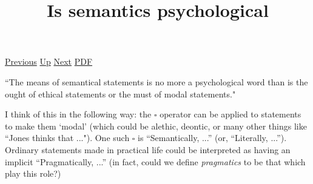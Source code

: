 \documentclass[12pt,a4paper]{report}
\begin{document}
 \href{doc/phil/People/Sellars/Quotes/Exemplification.html}{Previous} 
 \href{doc/phil/People/Sellars/Quotes.html}{Up} 
 \href{doc/phil/People/Sellars/Quotes/Judgmentintheorderofexplanation.html}{Next} 
 \href{doc/phil/People/Sellars/Quotes/Issemanticspsychological.pdf}{PDF} 
\title{Is semantics psychological}
``The means of semantical statements is no more a psychological word than is
the ought of ethical statements or the must of modal statements."

I think of this in the following way: the $\square$ operator can be applied to
statements to make them `modal' (which could be alethic, deontic, or many other
things like ``Jones thinks that ..."). One such $\square$ is ``Semantically,
...'' (or, ``Literally, ...''). Ordinary statements made in practical life
 could be interpreted as having an implicit ``Pragmatically, ...'' (in fact,
 could we define \emph{pragmatics} to be that which play this role?)
\end{document}
